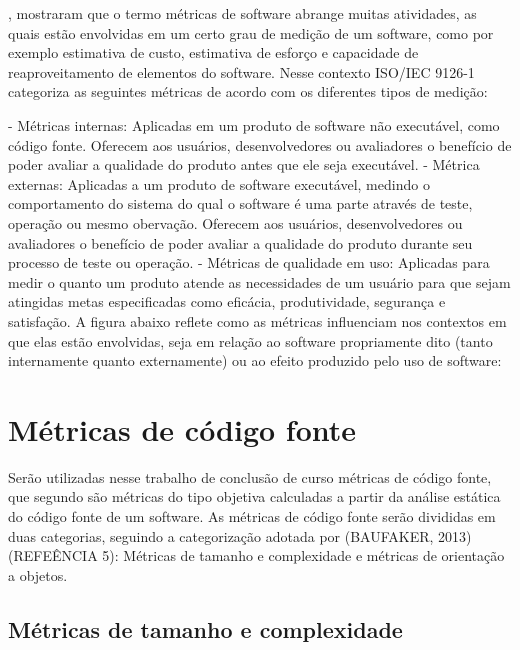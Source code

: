 , mostraram que o termo métricas de software abrange muitas atividades, as quais estão envolvidas em um certo grau de medição de um software, como por exemplo estimativa de custo, estimativa de esforço e capacidade de reaproveitamento de elementos do software. Nesse contexto ISO/IEC 9126-1 categoriza as seguintes métricas de acordo com os diferentes tipos de medição:

- Métricas internas: Aplicadas em um produto de software não executável, como código fonte. Oferecem aos usuários, desenvolvedores ou avaliadores o benefício de poder avaliar a qualidade do produto antes que ele seja executável.
- Métrica externas: Aplicadas a um produto de software executável, medindo o comportamento do sistema do qual o software é uma parte através de teste, operação ou mesmo obervação. Oferecem aos usuários, desenvolvedores ou avaliadores o benefício de poder avaliar a qualidade do produto durante seu processo de teste ou operação.
- Métricas de qualidade em uso: Aplicadas para medir o quanto um produto atende as necessidades de um usuário para que sejam atingidas metas especificadas como eficácia, produtividade, segurança e satisfação.
A figura abaixo reflete como as métricas influenciam nos contextos em que elas estão envolvidas, seja em relação ao software propriamente dito (tanto internamente quanto externamente) ou ao efeito produzido pelo uso de software:


\section{Métricas de código fonte}

Serão utilizadas nesse trabalho de conclusão de curso métricas de código fonte, que segundo \cite{Meirelles2013} são métricas do tipo objetiva calculadas a partir da análise estática do código fonte de um software. As métricas de código fonte serão divididas em duas categorias, seguindo a categorização adotada por (BAUFAKER, 2013) (REFEÊNCIA 5): Métricas de tamanho e complexidade e métricas de orientação a objetos.

\subsection{Métricas de tamanho e complexidade}

